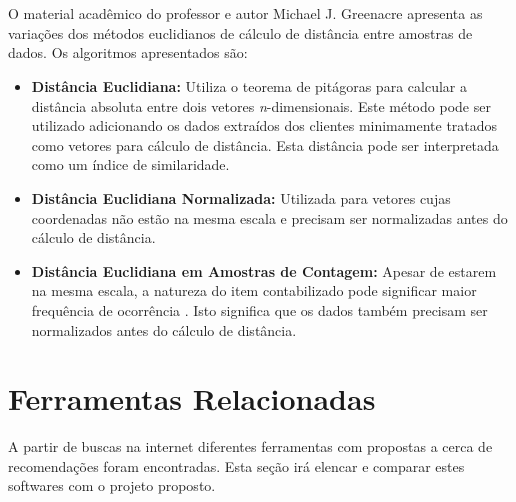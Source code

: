 \documentclass[
	12pt,				%
    oneside,			%
	a4paper,			%
	english,			%
	french,				%
	spanish,			%
	brazil,				%
	]{abntex2}
\begin{document}
\section{}
O material acadêmico do professor e autor Michael J. Greenacre apresenta as variações dos métodos euclidianos de cálculo de distância entre amostras de dados. Os algoritmos apresentados são:

\begin{itemize}
	\item \textbf{Distância Euclidiana:} Utiliza o teorema de pitágoras para calcular a distância absoluta entre dois vetores \textit{n}-dimensionais. Este método pode ser utilizado adicionando os dados extraídos 
	dos clientes minimamente tratados como vetores para cálculo de distância. Esta distância pode ser interpretada como um índice de similaridade.
	\item \textbf{Distância Euclidiana Normalizada:} Utilizada para vetores cujas coordenadas não estão na mesma escala e precisam ser normalizadas antes do cálculo de distância. 
	\item \textbf{Distância Euclidiana em Amostras de Contagem:} Apesar de estarem na mesma escala, a natureza do item contabilizado pode significar maior frequência de ocorrência \cite{7-MeasuresBetweenSamples}. 
	Isto significa que os dados também precisam ser normalizados antes do cálculo de distância. 
\end{itemize}

\section{Ferramentas Relacionadas}
A partir de buscas na internet diferentes ferramentas com propostas a cerca de recomendações foram encontradas. Esta seção irá elencar e comparar estes softwares com o projeto proposto.
\end{document}

